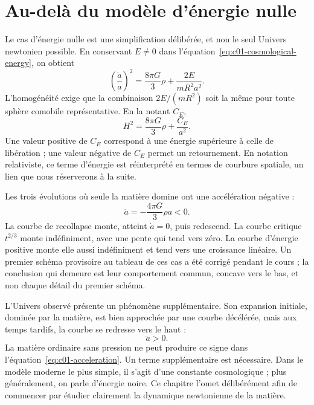 \section{Au-delà du modèle d’énergie nulle}

Le cas d’énergie nulle est une simplification délibérée, et non le seul Univers newtonien possible. En conservant \(E\neq0\) dans l’équation~\eqref{eq:c01-cosmological-energy}, on obtient
\begin{equation}
\left(\frac{\dot a}{a}\right)^2
=\frac{8\pi G}{3}\rho+\frac{2E}{mR^2a^2}.
\label{eq:c01-nonzero-energy}
\end{equation}
L’homogénéité exige que la combinaison \(2E/(mR^2)\) soit la même pour toute sphère comobile représentative. En la notant \(C_E\),
\begin{equation}
H^2=\frac{8\pi G}{3}\rho+\frac{C_E}{a^2}.
\end{equation}
Une valeur positive de \(C_E\) correspond à une énergie supérieure à celle de libération ; une valeur négative de \(C_E\) permet un retournement. En notation relativiste, ce terme d’énergie est réinterprété en termes de courbure spatiale, un lien que nous réserverons à la suite.

Les trois évolutions où seule la matière domine ont une accélération négative :
\begin{equation}
\ddot a=-\frac{4\pi G}{3}\rho a<0.
\end{equation}
La courbe de recollapse monte, atteint \(\dot a=0\), puis redescend. La courbe critique \(t^{2/3}\) monte indéfiniment, avec une pente qui tend vers zéro. La courbe d’énergie positive monte elle aussi indéfiniment et tend vers une croissance linéaire. Un premier schéma provisoire au tableau de ces cas a été corrigé pendant le cours ; la conclusion qui demeure est leur comportement commun, concave vers le bas, et non chaque détail du premier schéma.

L’Univers observé présente un phénomène supplémentaire. Son expansion initiale, dominée par la matière, est bien approchée par une courbe décélérée, mais aux temps tardifs, la courbe se redresse vers le haut :
\begin{equation}
\ddot a>0.
\end{equation}
La matière ordinaire sans pression ne peut produire ce signe dans l’équation~\eqref{eq:c01-acceleration}. Un terme supplémentaire est nécessaire. Dans le modèle moderne le plus simple, il s’agit d’une constante cosmologique ; plus généralement, on parle d’énergie noire. Ce chapitre l’omet délibérément afin de commencer par étudier clairement la dynamique newtonienne de la matière.

